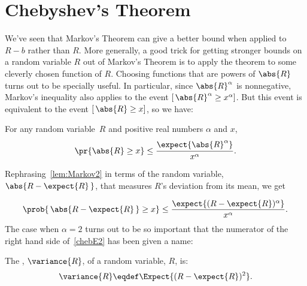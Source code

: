 \begin{problems}

\classproblems
{}

\homeworkproblems
{}
\end{problems}

\section{Chebyshev's Theorem}

We've seen that Markov's Theorem can give a better bound when applied
to $R-b$ rather than $R$.  More generally, a good trick for getting
stronger bounds on a random variable $R$ out of Markov's Theorem is to
apply the theorem to some cleverly chosen function of $R$.
Choosing functions that are powers of $\abs{R}$ turns out to be
specially useful.  In particular, since $\abs{R}^\alpha$ is
nonnegative, Markov's inequality also applies to the event
$[\, \abs{R}^\alpha \geq x^\alpha]$.  But this event is equivalent to the
event $[\, \abs{R} \geq x]$, so we have:

\iffalse
It is a bit messy to apply Markov's Theorem directly to this problem,
because it's generally not easy to compute $\expect{\ \abs{R -
\expect{R}}\ }$.  However, since $\abs{R}$ and hence $\abs{R}^k$ are
nonnegative variables for any $R$, Markov's inequality also applies to the
event $[\abs{R}^k \geq x^k]$.  But this event is equivalent to the event
$[\abs{R} \geq x]$, so we have:
\fi

\begin{lemma}\label{lem:Markov2}
For any random variable~$R$ and positive real numbers $\alpha$ and $x$,
\[
\pr{\abs{R} \geq x} \leq \frac{\expect{\strut \abs{R}^\alpha}}{x^\alpha}.
\]
\end{lemma}
Rephrasing~\eqref{lem:Markov2} in terms of the random variable,
$\abs{R -  \expect{R}\, }$, that measures $R$'s deviation from its mean, we get

\begin{equation}\label{chebE2}
  \prob{\,\abs{R - \expect{R}\,} \geq x} \leq \frac{\expect{(R - \expect{R})^\alpha}}{x^\alpha}.
\end{equation}
The case when $\alpha =2$ turns out to be so important that the 
numerator of the right hand side of~\eqref{chebE2} has been given a 
name:

\begin{definition}\label{defvar}
The , $\variance{R}$, of a random variable, $R$, is:
\[
\variance{R} \eqdef \Expect{(R - \expect{R})^2}.
\]
\end{definition}

